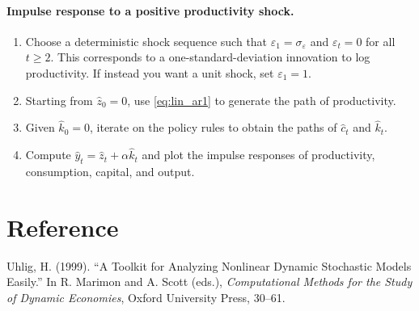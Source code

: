 \documentclass[12pt]{article}
\begin{document}
\paragraph{Impulse response to a positive productivity shock.}
\begin{enumerate}
\item Choose a deterministic shock sequence such that $\varepsilon_1=\sigma_\varepsilon$ and $\varepsilon_t=0$ for all $t\ge 2$. This corresponds to a one-standard-deviation innovation to log productivity. If instead you want a unit shock, set $\varepsilon_1=1$.
\item Starting from $\hat z_0=0$, use \eqref{eq:lin_ar1} to generate the path of productivity.
\item Given $\hat k_0=0$, iterate on the policy rules to obtain the paths of $\hat c_t$ and $\hat k_t$.
\item Compute $\hat y_t = \hat z_t + \alpha \hat k_t$ and plot the impulse responses of productivity, consumption, capital, and output.
\end{enumerate}

\section{Reference}

Uhlig, H. (1999). ``A Toolkit for Analyzing Nonlinear Dynamic Stochastic Models Easily.'' In R. Marimon and A. Scott (eds.), \textit{Computational Methods for the Study of Dynamic Economies}, Oxford University Press, 30--61.
\end{document}
